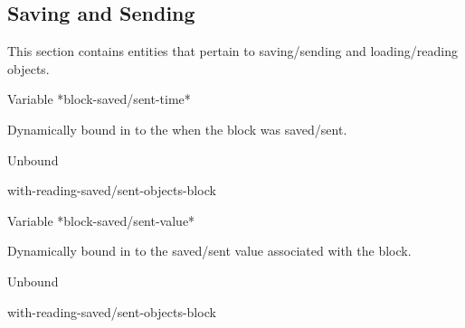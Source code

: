 \documentclass[10pt,twoside,english,pdftex]{article}
\begin{document}
\T\markright{}%
\T\pagestyle{plain}
\T\clearpage
\W{}
\T\pagestyle{fancy}
\T\thispagestyle{fancybottom}
\T\global\def\fnlastname{ }%

\subsection{Saving and Sending}
\label{sec:saving-sending}%

This section contains  entities that pertain to
saving/sending and loading/reading objects.

\W\entities
\T\clearpage


\begin{functiondoc}{Variable}%
{*block-saved/sent-time*}{}%

\fnsyntax

\fnpurpose Dynamically bound in
 to the
 when the block was saved/sent.

\fnpackage {}

\fnmodule {}

\fninitialvalue Unbound

\begin{alsos}{with-reading-saved/sent-objects-block}
\end{alsos}

\end{functiondoc}


\begin{functiondoc}{Variable}%
{*block-saved/sent-value*}{}%

\fnsyntax

\fnpurpose Dynamically bound in
 to the
saved/sent value associated with the block.

\fnpackage {}

\fnmodule {}

\fninitialvalue Unbound

\begin{alsos}{with-reading-saved/sent-objects-block}
\end{alsos}

\end{functiondoc}
\end{document}
